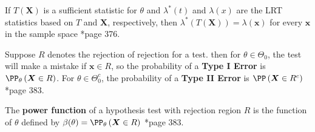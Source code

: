 \begin{thm} \label{thm: suff_lrt}
    If $T(\bm{X})$ is a sufficient statistic for $\theta$ and $\lambda^{\ast} (t)$ and $\lambda (x)$ are the LRT statistics based on $T$ and $\bm{X}$, respectively, then $\lambda^{\ast} (T(\bm{X})) = \lambda (\bm{x})$ for every $\bm{x}$ in the sample space \cite{CasellaGeorge2001SI}*{page 376}.
\end{thm}

\begin{defe} \label{defe: type_errors}
    Suppose $R$ denotes the rejection of rejection for a test. then for $\theta \in \Theta_{0}$, the test will make a mistake if $\bm{x} \in R$, so the probability of a {\bf Type I Error} is $\PP_{\theta} \left( \bm{X} \in R \right)$. For $\theta \in \Theta_{0}^{c}$, the probability of a {\bf Type II Error} is $\PP \left( \bm{X} \in R^{c} \right)$ \cite{CasellaGeorge2001SI}*{page 383}.
\end{defe}

\begin{defe} \label{defe: power_func}
    The {\bf power function} of a hypothesis test with rejection region $R$ is the function of $\theta$ defined by $\beta (\theta) = \PP_{\theta} \left( \bm{X} \in R \right)$ \cite{CasellaGeorge2001SI}*{page 383}.
\end{defe}

